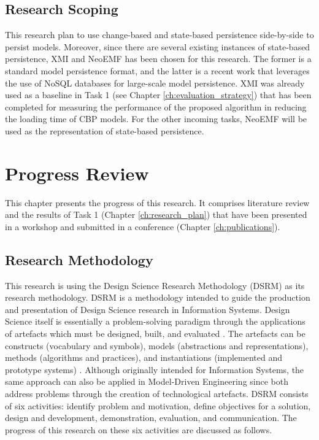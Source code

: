 \documentclass[12pt, a4paper]{report} \usepackage[titletoc]{appendix}
\begin{document}
\section{Research Scoping}
\label{sec:research_scoping}
This research plan to use change-based and state-based persistence side-by-side to persist models. Moreover, since there are several existing instances of state-based persistence, XMI and NeoEMF \cite{daniel2016neoemf} has been chosen for this research. The former is a standard model persistence format, and the latter is a recent work that leverages the use of NoSQL databases for large-scale model persistence. XMI was already used as a baseline in Task 1 (see Chapter \ref{ch:evaluation_strategy}) that has been completed for measuring the performance of the proposed algorithm in reducing the loading time of CBP models. For the other incoming tasks, NeoEMF will be used as the representation of state-based persistence.



\chapter{Progress Review}
\label{ch:progress_review}
This chapter presents the progress of this research. It comprises literature review and the results of Task 1 (Chapter \ref{ch:research_plan}) that have been presented in a workshop and submitted in a conference (Chapter \ref{ch:publications}). 

\section{Research Methodology}
\label{sec:research_methodology}
This research is using the Design Science Research Methodology (DSRM) \cite{peffers2007design} as its research methodology. DSRM is a methodology intended to guide the production and presentation of Design Science research in Information Systems. Design Science itself is essentially a problem-solving paradigm through the applications of artefacts which must be designed, built, and evaluated \cite{hevner2010design}. The artefacts can be constructs (vocabulary and symbols), models (abstractions and representations), methods (algorithms and practices), and instantiations (implemented and prototype systems) \cite{hevner2004design}. Although originally intended for Information Systems, the same approach can also be applied in Model-Driven Engineering since both address problems through the creation of technological artefacts. DSRM consists of six activities: identify problem and motivation, define objectives for a solution, design and development, demonstration, evaluation, and communication. The progress of this research on these six activities are discussed as follows.
\end{document}
